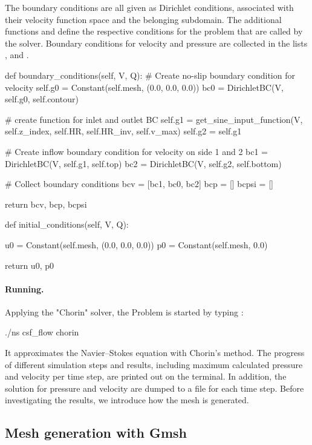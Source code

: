 The boundary conditions are all given as Dirichlet conditions,
associated with their velocity function space and the belonging
subdomain. The additional functions  and
 define the respective conditions for the problem
that are called by the solver. Boundary conditions for velocity and
pressure are collected in the lists ,  and .
\begin{python}
def boundary_conditions(self, V, Q):
	# Create no-slip boundary condition for velocity
	self.g0 = Constant(self.mesh, (0.0, 0.0, 0.0))
	bc0 = DirichletBC(V, self.g0, self.contour)

	# create function for inlet and outlet BC
	self.g1 = get_sine_input_function(V, self.z_index, self.HR, self.HR_inv, self.v_max)
	self.g2 = self.g1

	# Create inflow boundary condition for velocity on side 1 and 2
	bc1 = DirichletBC(V, self.g1, self.top)
	bc2 = DirichletBC(V, self.g2, self.bottom)

	# Collect boundary conditions
	bcv = [bc1, bc0, bc2]
	bcp = []
	bcpsi = []

	return bcv, bcp, bcpsi

def initial_conditions(self, V, Q):

	u0 = Constant(self.mesh, (0.0, 0.0, 0.0))
	p0 = Constant(self.mesh, 0.0)

	return u0, p0
\end{python}

\paragraph{Running.}
Applying the "Chorin" solver, the Problem is started by typing :
\begin{bash}
./ns csf_flow chorin
\end{bash}

It approximates the Navier--Stokes equation with Chorin's method. The
progress of different simulation steps and results, including maximum
calculated pressure and velocity per time step, are printed out on the
terminal. In addition, the solution for pressure and velocity are
dumped to a file for each time step. Before investigating the results,
we introduce how the mesh is generated.

\subsection{Mesh generation with Gmsh}

